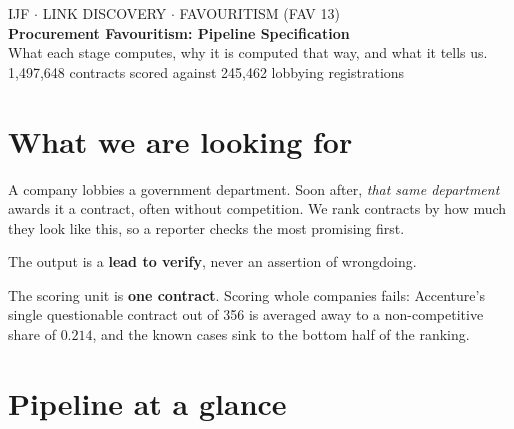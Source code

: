 \documentclass[11pt,a4paper]{article}
\begin{document}
\begin{center}
  {\color{slate}\ttfamily\footnotesize IJF $\cdot$ LINK DISCOVERY $\cdot$ FAVOURITISM (FAV 13)}\\[0.5em]
  {\LARGE\bfseries Procurement Favouritism: Pipeline Specification}\\[0.6em]
  {\color{slate}\small What each stage computes, why it is computed that way,
   and what it tells us.}\\[0.3em]
  {\color{slate}\footnotesize 1{,}497{,}648 contracts scored against 245{,}462 lobbying registrations}
\end{center}

\vspace{0.6em}

\section*{What we are looking for}

A company lobbies a government department. Soon after, \emph{that same department}
awards it a contract, often without competition. We rank contracts by how much they
look like this, so a reporter checks the most promising first.

The output is a \textbf{lead to verify}, never an assertion of wrongdoing.

The scoring unit is \textbf{one contract}. Scoring whole companies fails: Accenture's
single questionable contract out of 356 is averaged away to a non-competitive share of
$0.214$, and the known cases sink to the bottom half of the ranking.

\section*{Pipeline at a glance}
\end{document}
